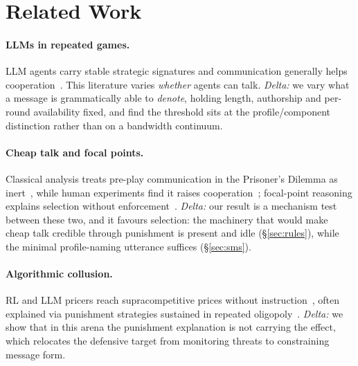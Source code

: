 \section{Related Work}
\label{sec:related}

\paragraph{LLMs in repeated games.}
LLM agents carry stable strategic signatures and communication generally helps
cooperation~\cite{akata2025repeated,herr2024strategic,duan2024gtbench,costarelli2024gamebench,madmoun2025communication,shaki2026folk}.
This literature varies \emph{whether} agents can talk. \emph{Delta:} we vary what a
message is grammatically able to \emph{denote}, holding length, authorship and
per-round availability fixed, and find the threshold sits at the profile/component
distinction rather than on a bandwidth continuum.

\paragraph{Cheap talk and focal points.}
Classical analysis treats pre-play communication in the Prisoner's Dilemma as
inert~\cite{crawford1982strategic}, while human experiments find it raises
cooperation~\cite{sally1995conversation}; focal-point reasoning explains selection
without enforcement~\cite{schelling1960strategy}. \emph{Delta:} our result is a
mechanism test between these two, and it favours selection: the machinery that would
make cheap talk credible through punishment is present and idle
(\S\ref{sec:rules}), while the minimal profile-naming utterance suffices
(\S\ref{sec:sms}).

\paragraph{Algorithmic collusion.}
RL and LLM pricers reach supracompetitive prices without
instruction~\cite{calvano2020ai,fish2024algorithmic,lin2024strategic,bracale2026institutional},
often explained via punishment strategies sustained in repeated
oligopoly~\cite{rotemberg1986pricewars}. \emph{Delta:} we show that in this arena the
punishment explanation is not carrying the effect, which relocates the defensive
target from monitoring threats to constraining message form.

